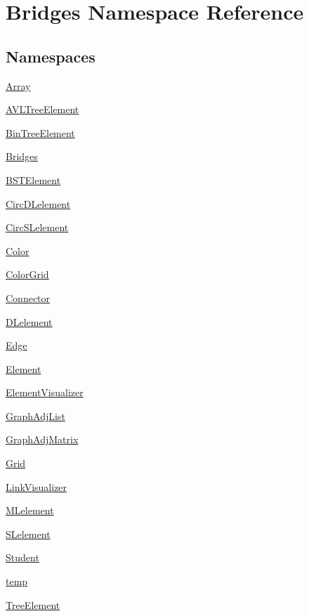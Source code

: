 \hypertarget{namespace_bridges}{}\section{Bridges Namespace Reference}
\label{namespace_bridges}
\subsection*{Namespaces}
\begin{DoxyCompactItemize}
\item 
 \mbox{\hyperlink{namespace_bridges_1_1_array}{Array}}
\item 
 \mbox{\hyperlink{namespace_bridges_1_1_a_v_l_tree_element}{A\+V\+L\+Tree\+Element}}
\item 
 \mbox{\hyperlink{namespace_bridges_1_1_bin_tree_element}{Bin\+Tree\+Element}}
\item 
 \mbox{\hyperlink{namespace_bridges_1_1_bridges}{Bridges}}
\item 
 \mbox{\hyperlink{namespace_bridges_1_1_b_s_t_element}{B\+S\+T\+Element}}
\item 
 \mbox{\hyperlink{namespace_bridges_1_1_circ_d_lelement}{Circ\+D\+Lelement}}
\item 
 \mbox{\hyperlink{namespace_bridges_1_1_circ_s_lelement}{Circ\+S\+Lelement}}
\item 
 \mbox{\hyperlink{namespace_bridges_1_1_color}{Color}}
\item 
 \mbox{\hyperlink{namespace_bridges_1_1_color_grid}{Color\+Grid}}
\item 
 \mbox{\hyperlink{namespace_bridges_1_1_connector}{Connector}}
\item 
 \mbox{\hyperlink{namespace_bridges_1_1_d_lelement}{D\+Lelement}}
\item 
 \mbox{\hyperlink{namespace_bridges_1_1_edge}{Edge}}
\item 
 \mbox{\hyperlink{namespace_bridges_1_1_element}{Element}}
\item 
 \mbox{\hyperlink{namespace_bridges_1_1_element_visualizer}{Element\+Visualizer}}
\item 
 \mbox{\hyperlink{namespace_bridges_1_1_graph_adj_list}{Graph\+Adj\+List}}
\item 
 \mbox{\hyperlink{namespace_bridges_1_1_graph_adj_matrix}{Graph\+Adj\+Matrix}}
\item 
 \mbox{\hyperlink{namespace_bridges_1_1_grid}{Grid}}
\item 
 \mbox{\hyperlink{namespace_bridges_1_1_link_visualizer}{Link\+Visualizer}}
\item 
 \mbox{\hyperlink{namespace_bridges_1_1_m_lelement}{M\+Lelement}}
\item 
 \mbox{\hyperlink{namespace_bridges_1_1_s_lelement}{S\+Lelement}}
\item 
 \mbox{\hyperlink{namespace_bridges_1_1_student}{Student}}
\item 
 \mbox{\hyperlink{namespace_bridges_1_1temp}{temp}}
\item 
 \mbox{\hyperlink{namespace_bridges_1_1_tree_element}{Tree\+Element}}
\end{DoxyCompactItemize}
